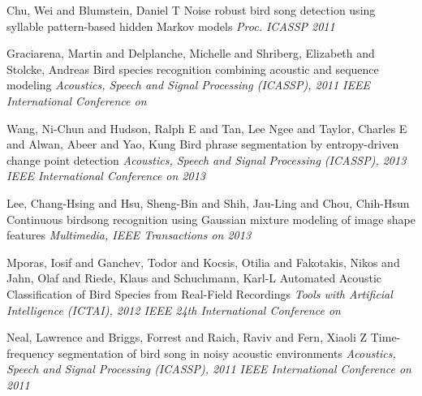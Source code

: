 \documentclass{article}
\begin{document}
\begin{thebibliography}{100}
Chu, Wei and Blumstein, Daniel T
Noise robust bird song detection using syllable pattern-based hidden {M}arkov models
\emph{Proc. ICASSP 2011}

Graciarena, Martin and Delplanche, Michelle and Shriberg, Elizabeth and Stolcke, Andreas
Bird species recognition combining acoustic and sequence modeling
\emph{Acoustics, Speech and Signal Processing (ICASSP), 2011 IEEE International
Conference on}

Wang, Ni-Chun and Hudson, Ralph E and Tan, Lee Ngee and Taylor, Charles E and Alwan, Abeer and Yao, Kung
Bird phrase segmentation by entropy-driven change point detection
\emph{Acoustics, Speech and Signal Processing (ICASSP), 2013 IEEE International
Conference on 2013}

Lee, Chang-Hsing and Hsu, Sheng-Bin and Shih, Jau-Ling and Chou, Chih-Hsun
Continuous birdsong recognition using Gaussian mixture modeling of image shape features
\emph{Multimedia, IEEE Transactions on 2013}

Mporas, Iosif and Ganchev, Todor and Kocsis, Otilia and Fakotakis, Nikos and Jahn, Olaf and Riede, Klaus and Schuchmann, Karl-L
Automated Acoustic Classification of Bird Species from Real-Field Recordings
\emph{Tools with Artificial Intelligence (ICTAI), 2012 IEEE 24th International
Conference on}

Neal, Lawrence and Briggs, Forrest and Raich, Raviv and Fern, Xiaoli Z
Time-frequency segmentation of bird song in noisy acoustic environments
\emph{Acoustics, Speech and Signal Processing (ICASSP), 2011 IEEE International
Conference on 2011}






















\end{thebibliography}
    
\end{document}
